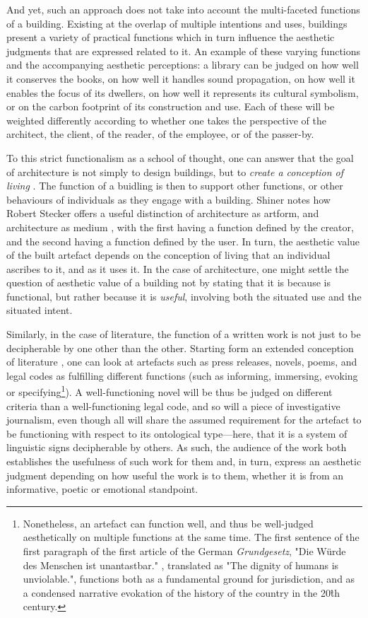 And yet, such an approach does not take into account the multi-faceted functions of a building. Existing at the overlap of multiple intentions and uses, buildings present a variety of practical functions which in turn influence the aesthetic judgments that are expressed related to it. An example of these varying functions and the accompanying aesthetic perceptions: a library can be judged on how well it conserves the books, on how well it handles sound propagation, on how well it enables the focus of its dwellers, on how well it represents its cultural symbolism, or on the carbon footprint of its construction and use. Each of these will be weighted differently according to whether one takes the perspective of the architect, the client, of the reader, of the employee, or of the passer-by.

To this strict functionalism as a school of thought, one can answer that the goal of architecture is not simply to design buildings, but to \emph{create a conception of living} \citep{graham_architecture_2000}. The function of a buidling is then to support other functions, or other behaviours of individuals as they engage with a building. Shiner notes how Robert Stecker offers a useful distinction of architecture as artform, and architecture as medium \citep{shiner_functional_2009}, with the first having a function defined by the creator, and the second having a function defined by the user. In turn, the aesthetic value of the built artefact depends on the conception of living that an individual ascribes to it, and as it uses it. In the case of architecture, one might settle the question of aesthetic value of  a building not by stating that it is because is functional, but rather because it is \emph{useful}, involving both the situated use and the situated intent.

Similarly, in the case of literature, the function of a written work is not just to be decipherable by one other than the other. Starting form an extended conception of literature \citep{gefen_extension_2019}, one can look at artefacts such as press releases, novels, poems, and legal codes as fulfilling different functions (such as informing, immersing, evoking or specifying\footnote{Nonetheless, an artefact can function well, and thus be well-judged aesthetically on multiple functions at the same time. The first sentence of the first paragraph of the first article of the German \emph{Grundgesetz}, "Die Würde des Menschen ist unantastbar." \citep{deutschebundestag_gg_2022}, translated as "The dignity of humans is unviolable.", functions both as a fundamental ground for jurisdiction, and as a condensed narrative evokation of the history of the country in the 20\^{th} century.}). A well-functioning novel will be thus be judged on different criteria than a well-functioning legal code, and so will a piece of investigative journalism, even though all will share the assumed requirement for the artefact to be functioning with respect to its ontological type—here, that it is a system of linguistic signs decipherable by others. As such, the audience of the work both establishes the usefulness of such work for them and, in turn, express an aesthetic judgment depending on how useful the work is to them, whether it is from an informative, poetic or emotional standpoint.

